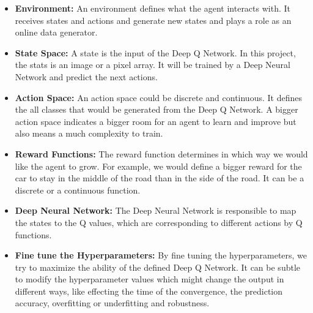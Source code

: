 \begin{itemize}
	
    \item \textbf{Environment:} An environment defines what the agent interacts with. It receives states and actions and generate new states and plays a role as an online data generator. 
    \item \textbf{State Space:} A state is the input of the Deep Q Network. In this project, the stats is an image or a pixel array. It will be trained by a Deep Neural Network and predict the next actions.
    \item \textbf{Action Space:} An action space could be discrete and continuous. It defines the all classes that would be generated from the Deep Q Network. A bigger action space indicates a bigger room for an agent to learn and improve but also means a much complexity to train.
    \item \textbf{Reward Functions:} The reward function determines in which way we would like the agent to grow. For example, we would define a bigger reward for the car to stay in the middle of the road than in the side of the road. It can be a discrete or a continuous function.
    \item \textbf{Deep Neural Network:} The Deep Neural Network is responsible to map the states to the Q values, which are corresponding to different actions by Q functions. 
    \item \textbf{Fine tune the Hyperparameters:} By fine tuning the hyperparameters, we try to maximize the ability of the defined Deep Q Network. It can be subtle to modify the hyperparameter values which might change the output in different ways, like effecting the time of the convergence, the prediction accuracy, overfitting or underfitting and robustness.
    
\end{itemize}






